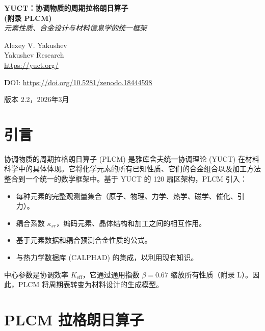 \documentclass[12pt,a4paper]{article}
\newcommand{\Keff}{K_{\mathrm{eff}}}
\newcommand{\be}{\beta}
\begin{document}
	
	\begin{titlepage}
		\centering
		\vspace*{1cm}
		\Huge\textbf{YUCT：协调物质的周期拉格朗日算子} \\
		\vspace{0.3cm}
		\Large\textbf{(附录 PLCM)} \\
		\vspace{0.5cm}
		\large\textit{元素性质、合金设计与材料信息学的统一框架}
		\vspace{2cm}
		
		\Large Alexey V. Yakushev \\
		\large Yakushev Research \\
		\url{https://yuct.org/}
		\vspace{2cm}
		
		\vspace{2cm}
		\textbf DOI: \url{https://doi.org/10.5281/zenodo.18444598}\\
		
		\vspace{1cm}
		
		\large 版本 2.2，2026年3月
		\vfill
	\end{titlepage}
	
	\tableofcontents
	\newpage
	
	\section{引言}
	
	协调物质的周期拉格朗日算子 (PLCM) 是雅库舍夫统一协调理论 (YUCT) 在材料科学中的具体体现。它将化学元素的所有已知性质、它们的合金组合以及加工方法整合到一个统一的数学框架中。基于 YUCT 的 120 扇区架构，PLCM 引入：
	\begin{itemize}
		\item 每种元素的完整观测量集合（原子、物理、力学、热学、磁学、催化、引力）。
		\item 耦合系数 \(\kappa_{sr}\)，编码元素、晶体结构和加工之间的相互作用。
		\item 基于元素数据和耦合预测合金性质的公式。
		\item 与热力学数据库 (CALPHAD) 的集成，以利用现有知识。
	\end{itemize}
	中心参数是协调效率 \(\Keff\)，它通过通用指数 \(\be = 0.67\) 缩放所有性质（附录 L）。因此，PLCM 将周期表转变为材料设计的生成模型。
	
	\section{PLCM 拉格朗日算子}
	
\end{document}
